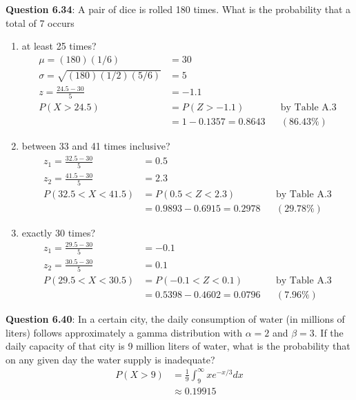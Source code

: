 \documentclass{article}
\begin{document}
    \noindent\textbf{Question 6.34}: A pair of dice is rolled 180 times. What is the
    probability that a total of 7 occurs
        \begin{enumerate}[label = (\alph*) ]
            \item at least 25 times?
                \begin{align*}
                    \mu = (180)(1/6) &= 30\\
                    \sigma = \sqrt{(180)(1/2)(5/6)} &= 5\\
                    z = \frac{24.5-30}{5} &= -1.1\\
                    P(X > 24.5) &= P(Z > -1.1) &&\text{by Table A.3}\\
                    &= 1-0.1357 = 0.8643 && (86.43\%)
                \end{align*}
            \item between 33 and 41 times inclusive?
                \begin{align*}
                    z_1=\frac{32.5-30}{5} &= 0.5\\
                    z_2=\frac{41.5-30}{5} &= 2.3\\
                    P(32.5 < X < 41.5) &= P(0.5 < Z < 2.3) &&\text{by Table A.3}\\
                    &= 0.9893 - 0.6915 = 0.2978 &&(29.78\%)
                \end{align*}
            \item exactly 30 times?
                \begin{align*}
                    z_1 = \frac{29.5-30}{5} &= -0.1\\
                    z_2 = \frac{30.5-30}{5} &= 0.1\\
                    P(29.5 < X < 30.5) &= P(-0.1 < Z < 0.1) &&\text{by Table A.3}\\
                    &= 0.5398 - 0.4602 = 0.0796 && (7.96\%)
                \end{align*}
        \end{enumerate}

    \noindent\textbf{Question 6.40}: In a certain city, the daily consumption of water
    (in millions of liters) follows approximately a gamma distribution with 
    $\alpha = 2$ and $\beta = 3$. If the daily capacity of that city is 9 
    million liters of water, what is the probability that on any given day 
    the water supply is inadequate?
        \begin{align*}
            P(X>9) &= \frac{1}{9}\int_9^\infty xe^{-x/3}dx\\
            &\approx 0.19915
        \end{align*}
\end{document}
